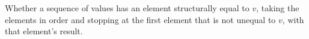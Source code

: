Whether a sequence of values has an element structurally equal to $v$, taking the elements in order
and stopping at the first element that is not unequal to $v$, with that element's result.
